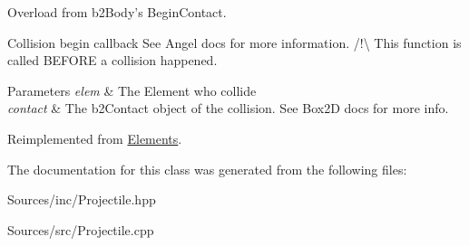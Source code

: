 Overload from b2\-Body's Begin\-Contact. 

Collision begin callback See Angel docs for more information. /!\textbackslash{} This function is called B\-E\-F\-O\-R\-E a collision happened. 
\begin{DoxyParams}{Parameters}
{\em elem} & The Element who collide \\
\hline
{\em contact} & The b2\-Contact object of the collision. See Box2\-D docs for more info. \\
\hline
\end{DoxyParams}


Reimplemented from \hyperlink{class_elements}{Elements}.



The documentation for this class was generated from the following files\-:\begin{DoxyCompactItemize}
\item 
Sources/inc/Projectile.\-hpp\item 
Sources/src/Projectile.\-cpp\end{DoxyCompactItemize}
